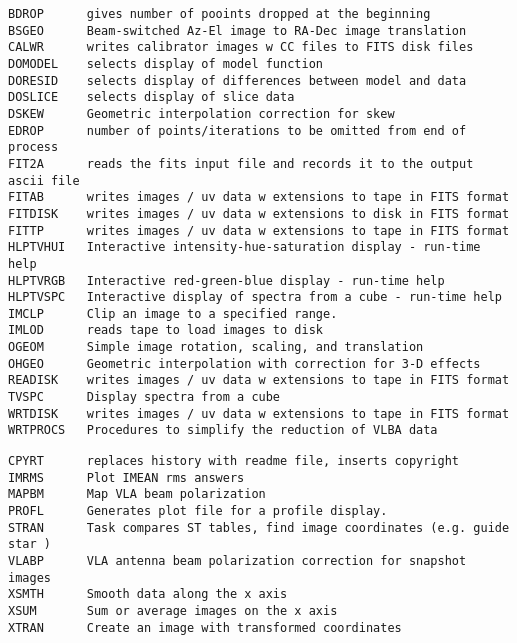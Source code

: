 \vskip 0.5pt
\bbve\begin{verbatim}
BDROP      gives number of pooints dropped at the beginning
BSGEO      Beam-switched Az-El image to RA-Dec image translation
CALWR      writes calibrator images w CC files to FITS disk files
DOMODEL    selects display of model function
DORESID    selects display of differences between model and data
DOSLICE    selects display of slice data
DSKEW      Geometric interpolation correction for skew
EDROP      number of points/iterations to be omitted from end of process
FIT2A      reads the fits input file and records it to the output ascii file
FITAB      writes images / uv data w extensions to tape in FITS format
FITDISK    writes images / uv data w extensions to disk in FITS format
FITTP      writes images / uv data w extensions to tape in FITS format
HLPTVHUI   Interactive intensity-hue-saturation display - run-time help
HLPTVRGB   Interactive red-green-blue display - run-time help
HLPTVSPC   Interactive display of spectra from a cube - run-time help
IMCLP      Clip an image to a specified range.
IMLOD      reads tape to load images to disk
OGEOM      Simple image rotation, scaling, and translation
OHGEO      Geometric interpolation with correction for 3-D effects
READISK    writes images / uv data w extensions to tape in FITS format
TVSPC      Display spectra from a cube
WRTDISK    writes images / uv data w extensions to tape in FITS format
WRTPROCS   Procedures to simplify the reduction of VLBA data
\end{verbatim}\eve


\vskip 0.5pt
\bbve\begin{verbatim}
CPYRT      replaces history with readme file, inserts copyright
IMRMS      Plot IMEAN rms answers
MAPBM      Map VLA beam polarization
PROFL      Generates plot file for a profile display.
STRAN      Task compares ST tables, find image coordinates (e.g. guide star )
VLABP      VLA antenna beam polarization correction for snapshot images
XSMTH      Smooth data along the x axis
XSUM       Sum or average images on the x axis
XTRAN      Create an image with transformed coordinates
\end{verbatim}\eve

\vfill\eject
{}

